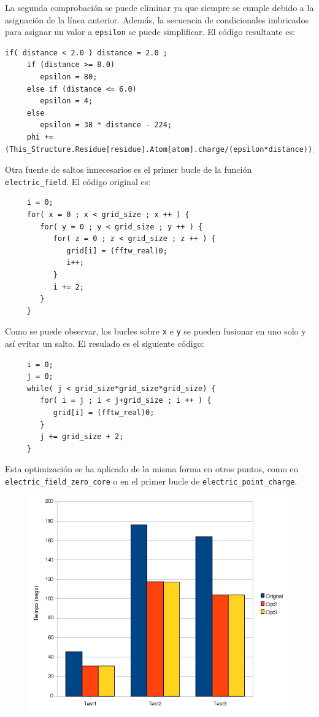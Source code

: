 La segunda comprobaci\'{o}n se puede eliminar ya que siempre se cumple debido a
la asignaci\'{o}n de la l\'{i}nea anterior. Adem\'{a}s, la secuencia de
condicionales imbricados para asignar un valor a \texttt{epsilon} se puede
simplificar. El c\'{o}digo resultante es:

\begin{lstlisting}[]
     if( distance < 2.0 ) distance = 2.0 ;
     if (distance >= 8.0)
        epsilon = 80;
     else if (distance <= 6.0)
        epsilon = 4;
     else
        epsilon = 38 * distance - 224;
     phi += (This_Structure.Residue[residue].Atom[atom].charge/(epsilon*distance));
\end{lstlisting}

Otra fuente de saltos innecesarios es el primer bucle de la funci\'{o}n
\texttt{electric\_field}. El c\'{o}digo original es:

\begin{lstlisting}
     i = 0;
     for( x = 0 ; x < grid_size ; x ++ ) {
        for( y = 0 ; y < grid_size ; y ++ ) {
           for( z = 0 ; z < grid_size ; z ++ ) {
              grid[i] = (fftw_real)0;
              i++;
           }
           i += 2;
        }
     }
\end{lstlisting}

Como se puede observar, los bucles sobre \texttt{x} e \texttt{y} se pueden
fusionar en uno solo y as\'{i} evitar un salto. El resulado es el siguiente
c\'{o}digo:

\begin{lstlisting}
     i = 0; 
     j = 0;
     while( j < grid_size*grid_size*grid_size) {
        for( i = j ; i < j+grid_size ; i ++ ) {
           grid[i] = (fftw_real)0;
        }
        j += grid_size + 2;
     }
\end{lstlisting}

Esta optimizaci\'{o}n se ha aplicado de la misma forma en otros puntos, como en
\texttt{electric\_field\_zero\_core} o en el primer bucle de
\texttt{electric\_point\_charge}.

\begin{figure}[ht]
   \centering
   \includegraphics[keepaspectratio=true,width=.6\textwidth]{figures/opt3-perf}
\end{figure}

